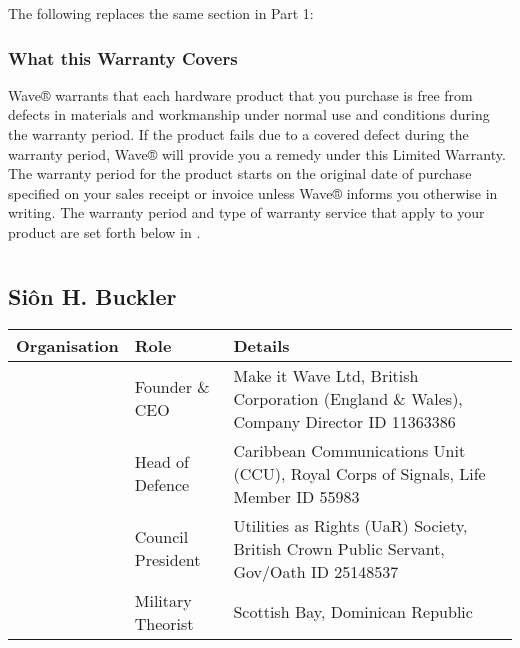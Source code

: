 \documentclass[letterpaper,10pt,english]{sphinxmanual}
\begin{document}
The following replaces the same section in Part 1:


\subsection{What this Warranty Covers}
\label{\detokenize{part3:what-this-warranty-covers}}
Wave® warrants that each hardware product that you purchase is free from defects in materials and workmanship under normal use and conditions during the warranty period. If the product fails due to a covered defect during the warranty period, Wave® will provide you a remedy under this Limited Warranty. The warranty period for the product starts on the original date of purchase specified on your sales receipt or invoice unless Wave® informs you otherwise in writing. The warranty period and type of warranty service that apply to your product are set forth below in .


\chapter{}
\label{\detokenize{index:document-author-s}}

\section{Siôn H. Buckler}
\label{\detokenize{index:sion-h-buckler}}

\begin{savenotes}\sphinxattablestart
\centering
\begin{tabulary}{\linewidth}[t]{|T|T|T|}
\hline
\sphinxstyletheadfamily 
Organisation
&\sphinxstyletheadfamily 
Role
&\sphinxstyletheadfamily 
Details
\\
\hline
\noindent{}
&
Founder \& CEO
&
Make it Wave Ltd, British Corporation (England \& Wales), Company Director ID 11363386
\\
\hline
\noindent{}
&
Head of Defence
&
Caribbean Communications Unit (CCU), Royal Corps of Signals, Life Member ID 55983
\\
\hline
\noindent{}
&
Council President
&
Utilities as Rights (UaR) Society, British Crown Public Servant, Gov/Oath ID 25148537
\\
\hline
\noindent{}
&
Military Theorist
&
Scottish Bay, Dominican Republic
\\
\hline
\end{tabulary}
\par
\sphinxattableend\end{savenotes}
\end{document}
